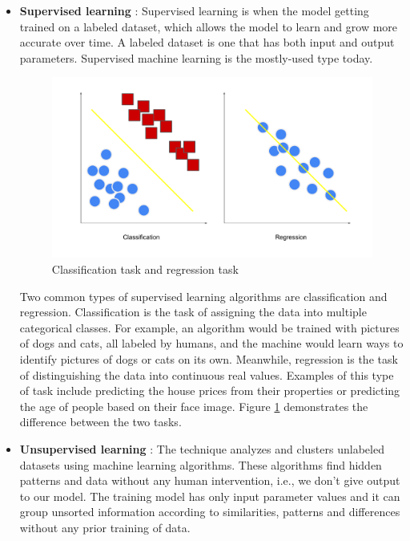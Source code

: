 \begin{itemize}
    
\item  \textbf{Supervised learning} \cite{goodfellow2016deep}: Supervised learning is when the model getting trained on a labeled dataset, which allows the model to learn and grow more accurate over time. A labeled dataset is one that has both input and output parameters. Supervised machine learning is the mostly-used type today.

\begin{figure}[!h]
    \centering
    \includegraphics[width=\textwidth]{content/resources/new_images/related_works/supervised.pdf}
    \caption{Classification task and regression task}
    \label{fig:supervised}
\end{figure}

Two common types of supervised learning algorithms are classification and regression. Classification is the task of assigning the data into multiple categorical classes. For example, an algorithm would be trained with pictures of dogs and cats, all labeled by humans, and the machine would learn ways to identify pictures of dogs or cats on its own.
Meanwhile, regression is the task of distinguishing the data into continuous real values. Examples of this type of task include predicting the house prices from their properties or predicting the age of people based on their face image. Figure \ref{fig:supervised} demonstrates the difference between the two tasks.

 
\item  \textbf{Unsupervised learning} \cite{goodfellow2016deep}: The technique analyzes and clusters unlabeled datasets using machine learning algorithms. These algorithms find hidden patterns and data without any human intervention, i.e., we don’t give output to our model. The training model has only input parameter values and it can group unsorted information according to similarities, patterns and differences without any prior training of data.


\end{itemize}
